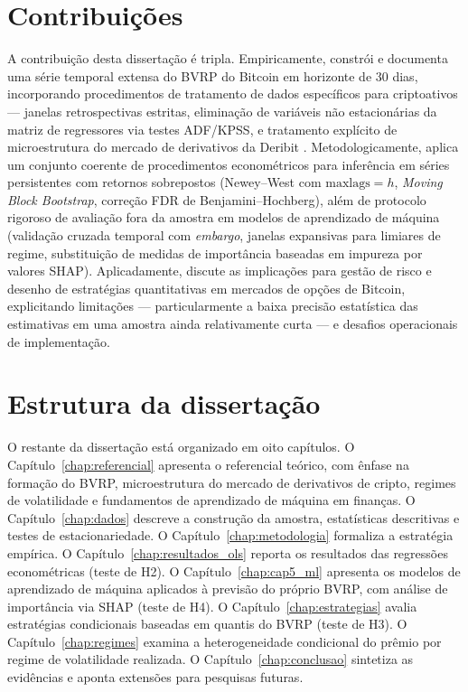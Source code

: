 \section*{Contribuições}

A contribuição desta dissertação é tripla. Empiricamente, constrói e documenta uma série temporal extensa do BVRP do Bitcoin em horizonte de 30 dias, incorporando procedimentos de tratamento de dados específicos para criptoativos --- janelas retrospectivas estritas, eliminação de variáveis não estacionárias da matriz de regressores via testes ADF/KPSS, e tratamento explícito de microestrutura do mercado de derivativos da Deribit \citep{alexanderImeraj2019}. Metodologicamente, aplica um conjunto coerente de procedimentos econométricos para inferência em séries persistentes com retornos sobrepostos (Newey--West com $\text{maxlags} = h$, \textit{Moving Block Bootstrap}, correção FDR de Benjamini--Hochberg), além de protocolo rigoroso de avaliação fora da amostra em modelos de aprendizado de máquina (validação cruzada temporal com \textit{embargo}, janelas expansivas para limiares de regime, substituição de medidas de importância baseadas em impureza por valores SHAP). Aplicadamente, discute as implicações para gestão de risco e desenho de estratégias quantitativas em mercados de opções de Bitcoin, explicitando limitações --- particularmente a baixa precisão estatística das estimativas em uma amostra ainda relativamente curta --- e desafios operacionais de implementação.

\section*{Estrutura da dissertação}

O restante da dissertação está organizado em oito capítulos. O Capítulo~\ref{chap:referencial} apresenta o referencial teórico, com ênfase na formação do BVRP, microestrutura do mercado de derivativos de cripto, regimes de volatilidade e fundamentos de aprendizado de máquina em finanças. O Capítulo~\ref{chap:dados} descreve a construção da amostra, estatísticas descritivas e testes de estacionariedade. O Capítulo~\ref{chap:metodologia} formaliza a estratégia empírica. O Capítulo~\ref{chap:resultados_ols} reporta os resultados das regressões econométricas (teste de H2). O Capítulo~\ref{chap:cap5_ml} apresenta os modelos de aprendizado de máquina aplicados à previsão do próprio BVRP, com análise de importância via SHAP (teste de H4). O Capítulo~\ref{chap:estrategias} avalia estratégias condicionais baseadas em quantis do BVRP (teste de H3). O Capítulo~\ref{chap:regimes} examina a heterogeneidade condicional do prêmio por regime de volatilidade realizada. O Capítulo~\ref{chap:conclusao} sintetiza as evidências e aponta extensões para pesquisas futuras.

